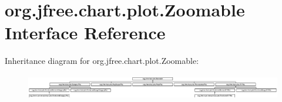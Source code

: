 \hypertarget{interfaceorg_1_1jfree_1_1chart_1_1plot_1_1_zoomable}{}\section{org.\+jfree.\+chart.\+plot.\+Zoomable Interface Reference}
\label{interfaceorg_1_1jfree_1_1chart_1_1plot_1_1_zoomable}
Inheritance diagram for org.\+jfree.\+chart.\+plot.\+Zoomable\+:\begin{figure}[H]
\begin{center}
\leavevmode
\includegraphics[height=1.117764cm]{interfaceorg_1_1jfree_1_1chart_1_1plot_1_1_zoomable}
\end{center}
\end{figure}
